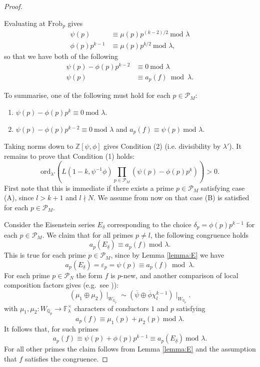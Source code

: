 \documentclass{amsart}
\theoremstyle{plain}
\theoremstyle{definition}
\begin{document}
\begin{proof}
\begin{enumerate}
    \noindent Evaluating at $\text{Frob}_p$ gives \begin{align*}\psi(p) &\equiv \mu(p)p^{(k-2)/2} \ \text{mod } \lambda\\ \phi(p)p^{k-1} &\equiv \mu(p)p^{k/2} \ \text{mod } \lambda,\end{align*} so that we have both of the following
    \begin{align*}
        \psi(p) - \phi(p)p^{k-2} &\equiv 0 \ \text{mod } \lambda\\ \psi(p) &\equiv a_p(f) \bmod \lambda.
    \end{align*}
\end{enumerate}

\noindent To summarise, one of the following must hold for each $p\in \mathcal{P}_M$:
\begin{enumerate}
    \item[(A)] $ \psi(p) - \phi(p)p^k \equiv 0 \ \text{mod } \lambda.$
    \item[(B)] $\psi(p) - \phi(p)p^{k-2} \equiv 0 \ \text{mod } \lambda$ and $a_p(f) \equiv \psi(p) \ \text{mod } \lambda$.
\end{enumerate}
Taking norms down to $\mathbb{Z}[\psi,\phi]$ gives Condition (2) (i.e. divisibility by $\lambda'$). It remains to prove that Condition (1) holds: \[\text{ord}_{\lambda'}\left(L(1-k, \psi^{-1}\phi) \prod_{p \in \mathcal{P}_M} (\psi(p) - \phi(p)p^k)\right) > 0.\] First note that this is immediate if there exists a prime $p \in \mathcal{P}_M$ satisfying case (A), since $l>k+1$ and $l\nmid N$. We assume from now on that case (B) is satisfied for each $p \in \mathcal{P}_M$.

Consider the Eisenstein series $E_{\underline{\delta}}$ corresponding to the choice $\delta_p=\phi(p)p^{k-1}$ for each $p \in \mathcal{P}_M$. We claim that for all primes $p\neq l$, the following congruence holds
\begin{equation*}
    a_p(E_{\underline{\delta}}) \equiv a_p(f) \ \text{mod } \lambda.
\end{equation*}
This is true for each prime $p\in \mathcal{P}_M$, since by Lemma \ref{lemma:E} we have \[a_p(E_{\underline{\delta}}) = \varepsilon_p = \psi(p) \equiv a_p(f) \bmod \lambda .\]  For each prime $p\in \mathcal{P}_N$ the form $f$ is $p$-new, and another comparison of local composition factors gives (e.g.\ see \cite[Theorem 4.2.7, (3)(a)]{hida})):
\begin{equation*}
 (\mu_1\oplus\mu_2)\mid_{W_{\mathbb{Q}_p}} \sim \left(\overline{\psi} \oplus \overline{\phi} \chi_l^{k-1}\right)\mid_{W_{\mathbb{Q}_p}}.
\end{equation*}
with $\mu_1,\mu_2: W_{\mathbb{Q}_p}\rightarrow\mathbb{F}_\lambda^{\times}$ characters of conductors $1$ and $p$ satisfying \[a_p(f) \equiv \mu_1(p)+\mu_2(p) \ \text{mod } \lambda.\] It follows that, for such primes \[a_p(f) \equiv \psi(p) + \phi(p)p^{k-1} \equiv a_p(E_{\underline{\delta}}) \ \text{mod } \lambda.\] For all other primes the claim follows from Lemma \ref{lemma:E} and the assumption that $f$ satisfies the congruence.
 

\end{proof}
\end{document}
